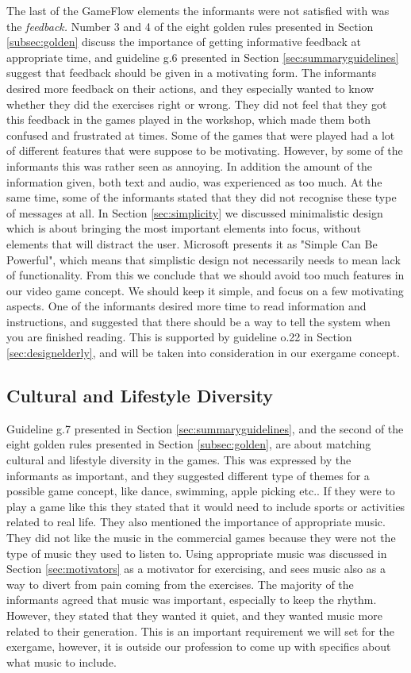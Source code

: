The last of the GameFlow elements the informants were not satisfied with was the \emph{feedback.} Number 3 and 4 of the eight golden \cite{mmi} rules presented in Section \ref{subsec:golden} discuss the importance of getting informative feedback at appropriate time, and guideline g.6 presented in Section \ref{sec:summaryguidelines} suggest that feedback should be given in a motivating form. The informants desired more feedback on their actions, and they especially wanted to know whether they did the exercises right or wrong. They did not feel that they got this feedback in the games played in the workshop, which made them both confused and frustrated at times. Some of the games that were played had a lot of different features that were suppose to be motivating. However, by some of the informants this was rather seen as annoying.  In addition the amount of the information given, both text and audio, was experienced as too much. At the same time, some of the informants stated that they did not recognise these type of messages at all. In Section \ref{sec:simplicity} we discussed minimalistic design which is about bringing the most important elements into focus, without elements that will distract the user. Microsoft presents it as "Simple Can Be Powerful", which means that simplistic design not necessarily needs to mean lack of functionality. From this we conclude that we should avoid too much features in our video game concept. We should keep it simple, and focus on a few motivating aspects. One of the informants desired more time to read information and instructions, and suggested that there should be a way to tell the system when you are finished reading. This is supported by guideline o.22 in Section \ref{sec:designelderly}, and will be taken into consideration in our exergame concept. 

\subsection{Cultural and Lifestyle Diversity}
Guideline g.7 presented in Section \ref{sec:summaryguidelines}, and the second of the eight golden rules presented in Section \ref{subsec:golden}, are about matching cultural and lifestyle diversity in the games. This was expressed by the informants as important, and they suggested different type of themes for a possible game concept, like dance, swimming, apple picking etc.. If they were to play a game like this they stated that it would need to include sports or activities related to real life. They also mentioned the importance of appropriate music. They did not like the music in the commercial games because they were not the type of music they used to listen to. Using appropriate music was discussed in Section \ref{sec:motivators} as a motivator for exercising, and \cite{schutzer} sees music also as a way to divert from pain coming from the exercises. The majority of the informants agreed that music was important, especially to keep the rhythm. However, they stated that they wanted it quiet, and they wanted music more related to their generation. This is an important requirement we will set for the exergame, however, it is outside our profession to come up with specifics about what music to include. 

